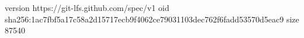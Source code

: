 version https://git-lfs.github.com/spec/v1
oid sha256:1ac7fbf5a17c58a2d15717ecb9f4062ce79031103dec762f6fadd53570d5eac9
size 87540
